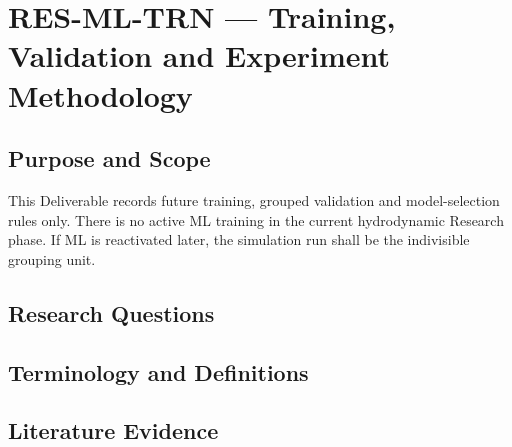 
\section{RES-ML-TRN --- Training, Validation and Experiment Methodology}
\label{sec:res-ml-trn}

\subsection{Purpose and Scope}
\label{sec:res-ml-trn-purpose}

This Deliverable records future training, grouped validation and
model-selection rules only. There is no active ML training in the
current hydrodynamic Research phase. If ML is reactivated later, the
simulation run shall be the indivisible grouping unit.

\subsection{Research Questions}
\label{sec:res-ml-trn-research-questions}


\subsection{Terminology and Definitions}
\label{sec:res-ml-trn-definitions}


\subsection{Literature Evidence}
\label{sec:res-ml-trn-literature-evidence}

%

